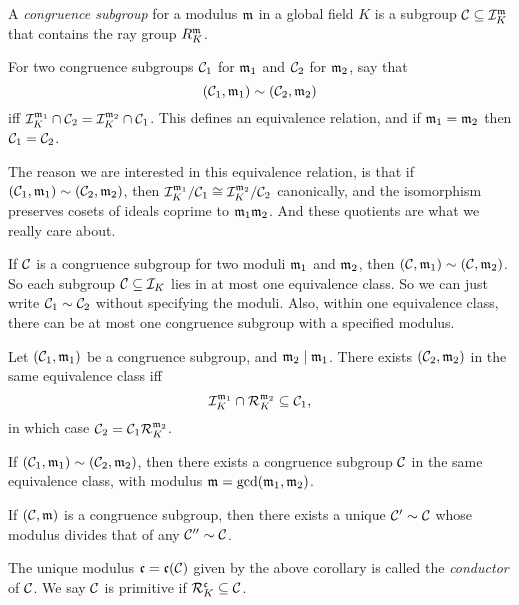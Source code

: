 \documentclass[11pt]{amsart}
\begin{document}
\begin{defn}
    A \emph{congruence subgroup} for a modulus $\mathfrak{m}$ in a global field $K$ is a subgroup $\mathcal{C}\subseteq \mathcal{I}_K^{\mathfrak{m}}$ that contains the ray group $R_K^{\mathfrak{m}}$.
\end{defn}


\begin{defn}
    For two congruence subgroups $\mathcal{C}_1$ for $\mathfrak{m}_1$ and $\mathcal{C}_2$ for $\mathfrak{m}_2$, say that
    \[(\mathcal{C}_1,\mathfrak{m}_1)\sim (\mathcal{C}_2,\mathfrak{m}_2)\]
    iff $\mathcal{I}_K^{\mathfrak{m}_1}\cap \mathcal{C}_2 = \mathcal{I}_K^{\mathfrak{m}_2}\cap \mathcal{C}_1$. This defines an equivalence relation, and if $\mathfrak{m}_1=\mathfrak{m}_2$ then $\mathcal{C}_1=\mathcal{C}_2$. 
\end{defn}

The reason we are interested in this equivalence relation, is that if $(\mathcal{C}_1,\mathfrak{m}_1)\sim (\mathcal{C}_2, \mathfrak{m}_2)$, then $\mathcal{I}_K^{\mathfrak{m}_1}/\mathcal{C}_1\cong \mathcal{I}_K^{\mathfrak{m}_2}/\mathcal{C}_2$ canonically, and the isomorphism preserves cosets of ideals coprime to $\mathfrak{m}_1\mathfrak{m}_2$. And these quotients are what we really care about.

If $\mathcal{C}$ is a congruence subgroup for two moduli $\mathfrak{m}_1$ and $\mathfrak{m}_2$, then $(\mathcal{C}, \mathfrak{m}_1)\sim (\mathcal{C}, \mathfrak{m}_2)$. So each subgroup $\mathcal{C}\subseteq \mathcal{I}_K$ lies in at most one equivalence class. So we can just write $\mathcal{C}_1\sim\mathcal{C}_2$ without specifying the moduli. Also, within one equivalence class, there can be at most one congruence subgroup with a specified modulus.

\begin{lem}
    Let $(\mathcal{C}_1,\mathfrak{m}_1)$ be a congruence subgroup, and $\mathfrak{m}_2\mid \mathfrak{m}_1$. There exists $(\mathcal{C}_2,\mathfrak{m}_2)$ in the same equivalence class iff
    \[\mathcal{I}_K^{\mathfrak{m}_1} \cap \mathcal{R}_K^{\mathfrak{m}_2} \subseteq \mathcal{C}_1,\]
    in which case $\mathcal{C}_2 = \mathcal{C}_1\mathcal{R}_K^{\mathfrak{m}_2}$.
\end{lem}

\begin{prop}
    If $(\mathcal{C}_1,\mathfrak{m}_1)\sim (\mathcal{C}_2,\mathfrak{m}_2)$, then there exists a congruence subgroup $\mathcal{C}$ in the same equivalence class, with modulus $\mathfrak{m} = \gcd(\mathfrak{m}_1,\mathfrak{m}_2)$.
\end{prop}


\begin{cor}
    If $(\mathcal{C}, \mathfrak{m})$ is a congruence subgroup, then there exists a unique $\mathcal{C}'\sim \mathcal{C}$ whose modulus divides that of any $\mathcal{C}''\sim \mathcal{C}$. 
\end{cor}

\begin{defn}
    The unique modulus $\mathfrak{c} = \mathfrak{c}(\mathcal{C})$ given by the above corollary is called the \emph{conductor} of $\mathcal{C}$. We say $\mathcal{C}$ is primitive if $\mathcal{R}_K^{\mathfrak{c}} \subseteq \mathcal{C}$.
\end{defn}
\end{document}
